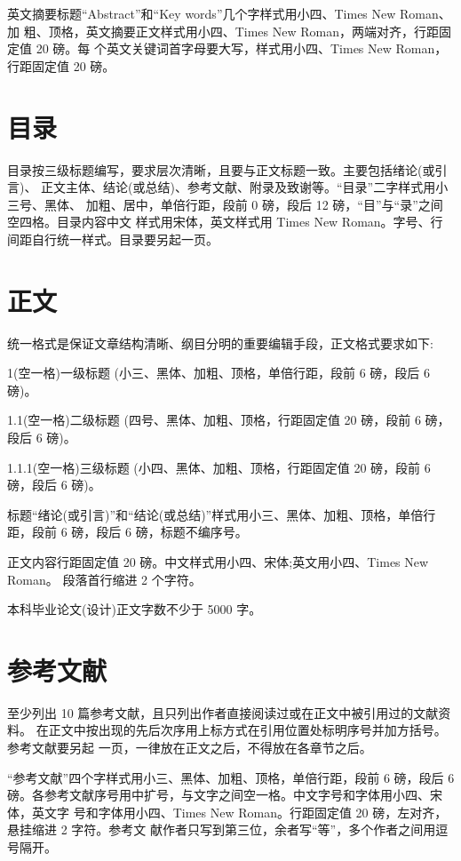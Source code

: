 英文摘要标题“Abstract”和“Key words”几个字样式用小四、Times New Roman、加 粗、顶格，英文摘要正文样式用小四、Times New Roman，两端对齐，行距固定值 20 磅。每 个英文关键词首字母要大写，样式用小四、Times New Roman，行距固定值 20 磅。

\section{目录}
目录按三级标题编写，要求层次清晰，且要与正文标题一致。主要包括绪论(或引言)、 正文主体、结论(或总结)、参考文献、附录及致谢等。“目录”二字样式用小三号、黑体、 加粗、居中，单倍行距，段前 0 磅，段后 12 磅，“目”与“录”之间空四格。目录内容中文 样式用宋体，英文样式用 Times New Roman。字号、行间距自行统一样式。目录要另起一页。

\section{正文}
统一格式是保证文章结构清晰、纲目分明的重要编辑手段，正文格式要求如下:

1(空一格)一级标题 (小三、黑体、加粗、顶格，单倍行距，段前 6 磅，段后 6 磅)。

1.1(空一格)二级标题 (四号、黑体、加粗、顶格，行距固定值 20 磅，段前 6 磅，段后 6 磅)。

1.1.1(空一格)三级标题 (小四、黑体、加粗、顶格，行距固定值 20 磅，段前 6 磅，段后 6 磅)。

标题“绪论(或引言)”和“结论(或总结)”样式用小三、黑体、加粗、顶格，单倍行 距，段前 6 磅，段后 6 磅，标题不编序号。

正文内容行距固定值 20 磅。中文样式用小四、宋体;英文用小四、Times New Roman。 段落首行缩进 2 个字符。

本科毕业论文(设计)正文字数不少于 5000 字。

\section{参考文献}

至少列出 10 篇参考文献，且只列出作者直接阅读过或在正文中被引用过的文献资料。 在正文中按出现的先后次序用上标方式在引用位置处标明序号并加方括号。参考文献要另起 一页，一律放在正文之后，不得放在各章节之后。

“参考文献”四个字样式用小三、黑体、加粗、顶格，单倍行距，段前 6 磅，段后 6 磅。各参考文献序号用中扩号，与文字之间空一格。中文字号和字体用小四、宋体，英文字 号和字体用小四、Times New Roman。行距固定值 20 磅，左对齐，悬挂缩进 2 字符。参考文 献作者只写到第三位，余者写“等”，多个作者之间用逗号隔开。

